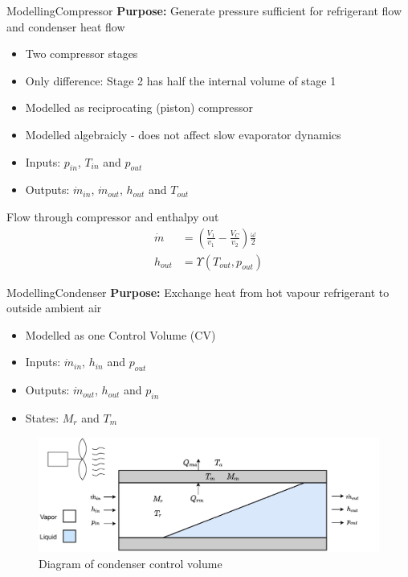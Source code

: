
\begin{frame}{Modelling}{Compressor}
	\textbf{Purpose:} Generate pressure sufficient for refrigerant flow and condenser heat flow
	\begin{itemize}
		\item Two compressor stages
		\item Only difference: Stage 2 has half the internal volume of stage 1
		\item Modelled as reciprocating (piston) compressor
		\item Modelled algebraicly - does not affect slow evaporator dynamics 
		\item Inputs: $p_{in}$, $T_{in}$ and $p_{out}$
		\item Outputs: $\dot{m}_{in}$, $\dot{m}_{out}$, $h_{out}$ and $T_{out}$
	\end{itemize}
Flow through compressor and enthalpy out
\begin{align}
	\dot{m} &= \left(\frac{V_1}{v_1} - \frac{V_C}{v_2}\right) \frac{\omega}{2} \label{eq:comp_mass_flow} \\
	h_{out} &= \Upsilon(T_{out}, p_{out}) \label{eq:comp_enthalpy}
\end{align}
\end{frame}


\begin{frame}{Modelling}{Condenser}
	\textbf{Purpose:} Exchange heat from hot vapour refrigerant to outside ambient air 
	\begin{itemize}
		\item Modelled as one Control Volume (CV)
		\item Inputs: $\dot{m}_{in}$, $h_{in}$ and $p_{out}$
		\item Outputs: $\dot{m}_{out}$, $h_{out}$ and $p_{in}$
		\item States: $M_r$ and $T_m$
	\end{itemize}
\begin{figure}[h!]
	\centering
	\includegraphics[width=1\textwidth]{../Graphics/Condenser.pdf}
	\caption{Diagram of condenser control volume}
	\label{fig:condenser_CV}
\end{figure}
\end{frame}

